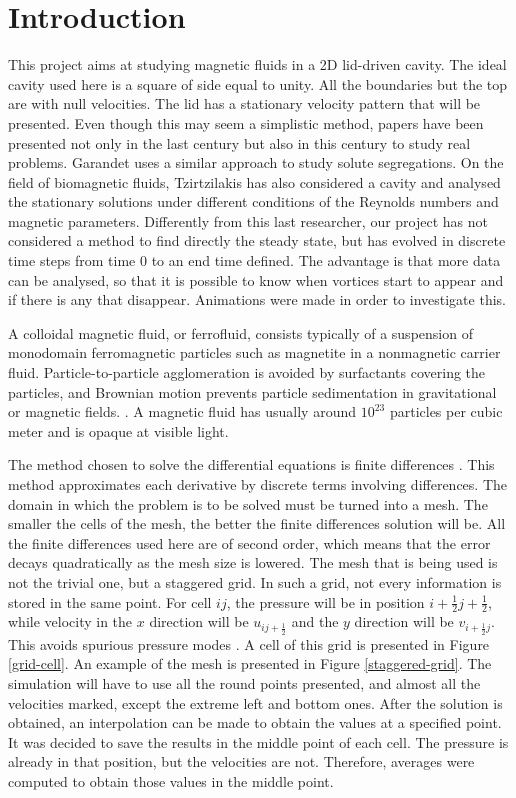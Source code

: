 \documentclass[journal]{IEEEtran}
\begin{document}
\section{Introduction}
This project aims at studying magnetic fluids in a 2D lid-driven cavity. The ideal cavity used here is a square of side equal to unity. All the boundaries but the top are with null velocities. The lid has a stationary velocity pattern that will be presented. Even though this may seem a simplistic method, papers have been presented not only in the last century but also in this century to study real problems. Garandet \cite{Garandet2012149} uses a similar approach to study solute segregations. On the field of biomagnetic fluids, Tzirtzilakis \cite{Tzirtzilakis2013} has also considered a cavity and analysed the stationary solutions under different conditions of the Reynolds numbers and magnetic parameters. Differently from this last researcher, our project has not considered a method to find directly the steady state, but has evolved in discrete time steps from time 0 to an end time defined. The advantage is that more data can be analysed, so that it is possible to know when vortices start to appear and if there is any that disappear. Animations were made in order to investigate this.

A colloidal magnetic fluid, or ferrofluid, consists typically of a suspension of monodomain ferromagnetic particles such as magnetite in a nonmagnetic carrier fluid. Particle-to-particle agglomeration is avoided by surfactants covering the particles, and Brownian motion prevents particle sedimentation in gravitational or magnetic fields.  \cite{RosensweigMagneticFluids}. A magnetic fluid has usually around $10^{23}$ particles per cubic meter and is opaque at visible light.

The method chosen to solve the differential equations is finite differences \cite{zbMATH03010997}. This method approximates each derivative by discrete terms involving differences. The domain in which the problem is to be solved must be turned into a mesh. The smaller the cells of the mesh, the better the finite differences solution will be. All the finite differences used here are of second order, which means that the error decays quadratically as the mesh size is lowered. The mesh that is being used is not the trivial one, but a staggered grid. In such a grid, not every information is stored in the same point. For cell $ij$, the pressure will be in position $i+\frac{1}{2}j+\frac{1}{2}$, while velocity in the $x$ direction will be $u_{ij+\frac{1}{2}}$ and the $y$ direction will be $v_{i+\frac{1}{2}j}$. This avoids spurious pressure modes \cite{hinchLectureNotes}. A cell of this grid is presented in Figure \ref{grid-cell}. An example of the mesh is presented in Figure \ref{staggered-grid}. The simulation will have to use all the round points presented, and almost all the velocities marked, except the extreme left and bottom ones. After the solution is obtained, an interpolation can be made to obtain the values at a specified point. It was decided to save the results in the middle point of each cell. The pressure is already in that position, but the velocities are not. Therefore, averages were computed to obtain those values in the middle point.
\end{document}
